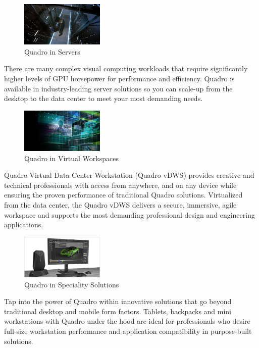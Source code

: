 \documentclass[xcolor=x11names,table]{beamer}
\begin{document}
\begin{frame}[allowframebreaks]
\begin{block}
{            }
        \end{block}
        \begin{block}{
            \begin{figure}[H]
            	\includegraphics[width=150px]{refs/design-vis-quadro-in-server-625-u@2x.jpg}
            	\caption{{\footnotesize Quadro in Servers}}
            \end{figure}
            }
            {
                There are many complex visual computing workloads that require significantly higher levels of GPU horsepower for performance and efficiency. Quadro is available in industry-leading server solutions so you can scale-up from the desktop to the data center to meet your most demanding needs.
            }
        \end{block}
        \begin{block}{
            \begin{figure}[H]
            	\includegraphics[width=150px]{refs/quadro-whats-new-feature-vdws-625-ud@2x.jpg}
            	\caption{{\footnotesize Quadro in Virtual Workspaces}}
            \end{figure}
            }
            {
                Quadro Virtual Data Center Workstation (Quadro vDWS) provides creative and technical professionals with access from anywhere, and on any device while ensuring the proven performance of traditional Quadro solutions. Virtualized from the data center, the Quadro vDWS delivers a secure, immersive, agile workspace and supports the most demanding professional design and engineering applications.
            }
        \end{block}
        \begin{block}{
            \begin{figure}[H]
            	\includegraphics[width=150px]{refs/quadro-whats-new-feature-specialty-625-ud@2x.jpg}
            	\caption{{\footnotesize Quadro in Speciality Solutions}}
            \end{figure}
            }
            {
                Tap into the power of Quadro within innovative solutions that go beyond traditional desktop and mobile form factors. Tablets, backpacks and mini workstations with Quadro under the hood are ideal for professionals who desire full-size workstation performance and application compatibility in purpose-built solutions.
            }
        \end{block}



\end{frame}
\end{document}
